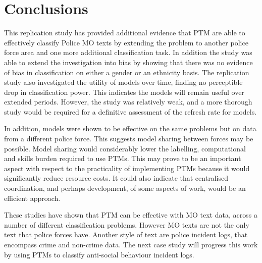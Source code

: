 \section{Conclusions}This replication study has provided additional evidence that PTM are able to effectively classify Police MO texts by extending the problem to another police force area and one more additional classification task. In addition the study was able to extend the investigation into bias by showing that there was no evidence of bias in classification on either a gender or an ethnicity basis. The replication study also investigated the utility of models over time, finding no perceptible drop in classification power. This indicates the models will remain useful over extended periods. However, the study was relatively weak,  and a more thorough study would be required for a definitive assessment of the refresh rate for models. 

In addition, models were  shown to be effective on the same problems but on data from a different police force. This suggests model sharing between forces may be possible. Model sharing would considerably lower the labelling, computational and skills burden required to use PTMs. This may prove to be an important aspect with respect to the practicality of implementing PTMs because it would significantly reduce resource costs. It could also indicate that centralised coordination, and perhaps development, of some aspects of work, would be an efficient approach. 

These studies have shown that PTM can be effective with MO text data, across a number of different classification problems. However MO texts are not the only text that police forces have. Another style of text are police incident logs, that encompass crime and non-crime data. The next case study will progress this work  by using PTMs to classify anti-social behaviour incident logs.
 






